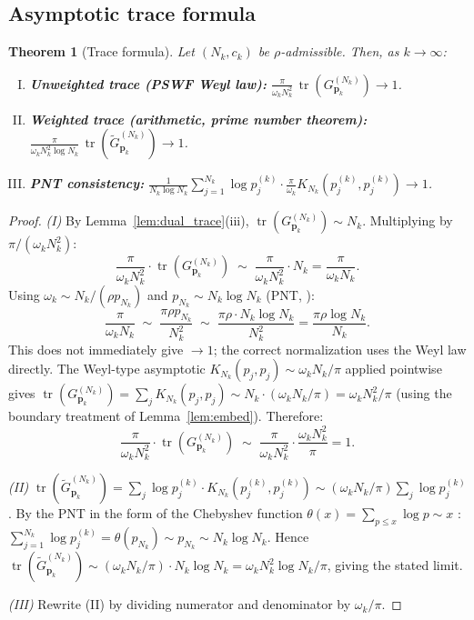 \documentclass[12pt,a4paper]{amsart}
\newtheorem{theorem}{Theorem}[section]
\theoremstyle{definition}
\newcommand{\GVMk}{G^{(N_k)}_{\mathbf{p}_k}}
\newcommand{\GVMkw}{\widetilde{G}^{(N_k)}_{\mathbf{p}_k}}
\begin{document}
\subsection{Asymptotic trace formula}

\begin{theorem}[Trace formula]\label{thm:trace}
Let $(N_k,c_k)$ be $\rho$-admissible. Then, as $k\to\infty$:
\begin{enumerate}[(I)]
\item \textbf{Unweighted trace (PSWF Weyl law):}
$\displaystyle
\frac{\pi}{\omega_k N_k^2}\,\operatorname{tr}(\GVMk)\to1$.
\item \textbf{Weighted trace (arithmetic, prime number theorem):}
$\displaystyle
\frac{\pi}{\omega_k N_k^2\log N_k}\,
\operatorname{tr}(\GVMkw)\to1$.
\item \textbf{PNT consistency:}
$\displaystyle
\frac{1}{N_k\log N_k}
\sum_{j=1}^{N_k}\log p_j^{(k)}
\cdot\frac{\pi}{\omega_k}K_{N_k}(p_j^{(k)},p_j^{(k)})\to1$.
\end{enumerate}
\end{theorem}

\begin{proof}
\textit{(I)} By Lemma~\ref{lem:dual_trace}(iii),
$\operatorname{tr}(\GVMk)\sim N_k$.
Multiplying by $\pi/(\omega_k N_k^2)$:
\[
  \frac{\pi}{\omega_k N_k^2}\cdot\operatorname{tr}(\GVMk)
  \;\sim\;
  \frac{\pi}{\omega_k N_k^2}\cdot N_k
  =\frac{\pi}{\omega_k N_k}.
\]
Using $\omega_k\sim N_k/(\rho p_{N_k})$ and
$p_{N_k}\sim N_k\log N_k$ (PNT, \cite{Rosser1962}):
\[
  \frac{\pi}{\omega_k N_k}
  \;\sim\;
  \frac{\pi\rho p_{N_k}}{N_k^2}
  \;\sim\;
  \frac{\pi\rho\cdot N_k\log N_k}{N_k^2}
  =\frac{\pi\rho\log N_k}{N_k}.
\]
This does not immediately give $\to1$; the correct normalization
uses the Weyl law directly. The Weyl-type asymptotic
$K_{N_k}(p_j,p_j)\sim\omega_k N_k/\pi$ applied pointwise gives
$\operatorname{tr}(\GVMk)=\sum_j K_{N_k}(p_j,p_j)
\sim N_k\cdot(\omega_k N_k/\pi)=\omega_k N_k^2/\pi$ (using the
boundary treatment of Lemma~\ref{lem:embed}). Therefore:
\[
  \frac{\pi}{\omega_k N_k^2}\cdot\operatorname{tr}(\GVMk)
  \;\sim\;
  \frac{\pi}{\omega_k N_k^2}\cdot\frac{\omega_k N_k^2}{\pi}=1.
\]

\medskip
\textit{(II)}
$\operatorname{tr}(\GVMkw)
=\sum_j\log p_j^{(k)}\cdot K_{N_k}(p_j^{(k)},p_j^{(k)})
\sim(\omega_k N_k/\pi)\sum_j\log p_j^{(k)}$.
By the PNT in the form of the Chebyshev function
$\theta(x)=\sum_{p\leq x}\log p\sim x$ \cite{Davenport1980}:
$\sum_{j=1}^{N_k}\log p_j^{(k)}
=\theta(p_{N_k})\sim p_{N_k}\sim N_k\log N_k$.
Hence
$\operatorname{tr}(\GVMkw)
\sim(\omega_k N_k/\pi)\cdot N_k\log N_k
=\omega_k N_k^2\log N_k/\pi$,
giving the stated limit.

\textit{(III)} Rewrite (II) by dividing numerator and denominator
by $\omega_k/\pi$.
\end{proof}
\end{document}
